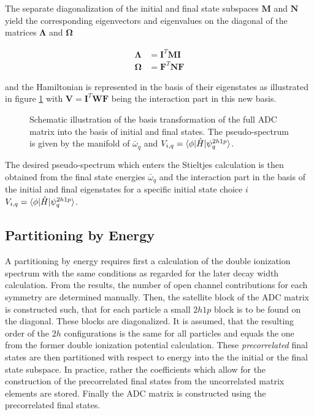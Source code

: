 The separate diagonalization of the initial and final state subspaces
$\mathbf{M}$ and $\mathbf{N}$ yield
the corresponding eigenvectors and eigenvalues on the diagonal of the
matrices $\mathbf{\Lambda}$ and $\mathbf{\Omega}$

\begin{align}
  \mathbf{\Lambda} &= \mathbf{I}^T \mathbf{M} \mathbf{I}  \\
  \mathbf{\Omega}  &= \mathbf{F}^T \mathbf{N} \mathbf{F} 
\end{align}

and the Hamiltonian is represented in the basis of their eigenstates
as illustrated in
figure \ref{figure:fano_bastrans} with $\mathbf{V} = \mathbf{I}^T \mathbf{W} \mathbf{F}$
being the interaction part
in this new basis.

\begin{figure}[h]
  \centering
  
  \caption{Schematic illustration of the basis transformation of the full \ac{ADC}
           matrix into the basis of initial and final states. The pseudo-spectrum
           is given by the manifold of $\bar{\omega}_q$ and
           $V_{i,q} = \braket{\phi |\hat{H}| \psi_{q}^{2h1p}}$.}
  \label{figure:fano_bastrans}
\end{figure}
The desired pseudo-spectrum which enters the Stieltjes calculation
is then obtained from the final state energies
$\bar{\omega}_q$ and the interaction part in the basis of the initial and
final eigenstates for a specific initial state choice $i$
$V_{i,q} = \braket{\phi |\hat{H}| \psi_{q}^{2h1p}}$.



\subsection{Partitioning by Energy}
A partitioning by energy requires first a calculation of the double ionization
spectrum with the same conditions as regarded for the later decay width
calculation. From the results, the number of open channel contributions
for each symmetry are determined manually. Then, the satellite block
of the \ac{ADC} matrix is constructed such, that for each particle a
small $2h1p$ block is to be found on the diagonal. These blocks are diagonalized.
It is assumed, that the resulting order of the $2h$ configurations is the
same for all particles and equals the one from the former double ionization
potential calculation. These \textit{precorrelated} final states are then
partitioned with respect to energy into the the initial or the final state
subspace. In practice, rather the coefficients which allow for the construction
of the precorrelated final states from the uncorrelated matrix elements are stored.
Finally the \ac{ADC} matrix is constructed using the precorrelated final states.

